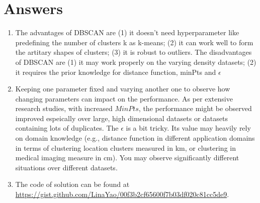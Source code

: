 \section{Answers}

\begin{enumerate}
\item The advantages of DBSCAN are (1) it doesn't need hyperparameter like predefining the number of clusters k as k-means; (2) it can work well to form the artitary shapes of clusters; (3) it is robust to outliers. The disadvantages of DBSCAN are (1) it may work properly on the varying density datasets; (2) it requires the prior knowledge for distance function, minPts and $\epsilon$ 
\item Keeping one parameter fixed and varying another one to observe how changing parameters can impact on the performance. As per extensive research studies, with increased $MinPts$, the performance might be observed improved espeically over large, high dimensional datasets or datasets containing lots of duplicates. The $\epsilon$ is a bit tricky. Its value may heavily rely on domain knowledge (e.g., distance function in different application domains in terms of clustering location clusters measured in km, or clustering in medical imaging measure in cm). You may observe significantly different situations over different datasets. 
\item The code of solution can be found at \url{https://gist.github.com/LinaYao/00f3b2cf65600f7b03df020c81cc5de9}.
\end{enumerate} 





